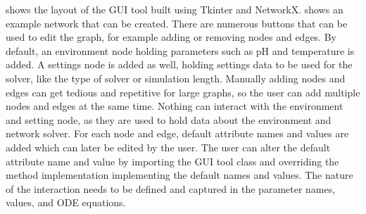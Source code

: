  shows the layout of the GUI tool built using Tkinter and NetworkX.  shows an example network that can be created. %
There are numerous buttons that can be used to edit the graph, for example adding or removing nodes and edges. 
By default, an environment node holding parameters such as pH and temperature is added.
A settings node is added as well, holding settings data to be used for the solver, like the type of solver or simulation length.
Manually adding nodes and edges can get tedious and repetitive for large graphs, so the user can add multiple nodes and edges at the same time.
Nothing can interact with the environment and setting node, as they are used to hold data about the environment and network solver.
For each node and edge, default attribute names and values are added which can later be edited by the user. 
The user can alter the default attribute name and value by importing the GUI tool class and overriding the method implementation implementing the default names and values. 
The nature of the interaction needs to be defined and captured in the parameter names, values, and ODE equations.

